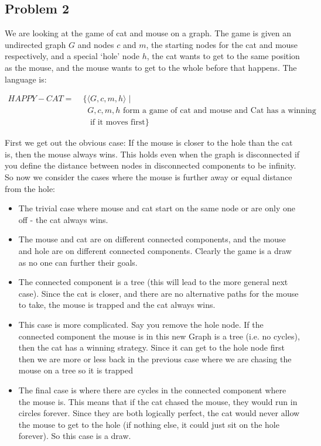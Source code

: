 \documentclass[english]{article}
\begin{document}
\subsection*{Problem 2}
We are looking at the game of cat and mouse on a graph. The game is given an undirected graph $G$ and nodes $c$ and
$m$, the starting nodes for the cat and mouse respectively, and a special `hole' node $h$, the cat wants to get to
the same position as the mouse, and the mouse wants to get to the whole before that happens. The language is:

\begin{align*}
HAPPY-CAT =&\; \{ \langle G,c,m,h \rangle \mid \\
          &\;\;\; G,c,m,h \textrm{ form a game of cat and mouse and Cat has a winning strategy} \\
          &\;\;\;    \textrm{ if it moves first} \}
\end{align*}

First we get out the obvious case: If the mouse is closer to the hole than the cat is, then the mouse always wins.
This holds even when the graph is disconnected if you define the distance between nodes in disconnected components
to be infinity. So now we consider the cases where the mouse is further away or equal distance from the hole:
\begin{itemize}
\item The trivial case where mouse and cat start on the same node or are only one off - the cat always wins.
\item The mouse and cat are on different connected components, and the mouse and hole are on different connected
components. Clearly the game is a draw as no one can further their goals. 
\item The connected component is a tree (this will lead to the more general next case). Since the cat is closer,
and there are no alternative paths for the mouse to take, the mouse is trapped and the cat always wins. 
\item This case is more complicated. Say you remove the hole node. If the connected component the mouse is in this
new Graph is a tree (i.e. no cycles), then the cat has a winning strategy. Since it can get to the hole node first
then we are more or less back in the previous case where we are chasing the mouse on a tree so it is trapped
\item The final case is where there are cycles in the connected component where the mouse is. This means that if the
cat chased the mouse, they would run in circles forever. Since they are both logically perfect, the cat would never
allow the mouse to get to the hole (if nothing else, it could just sit on the hole forever). So this case is a draw.
\end{itemize}
\end{document}

